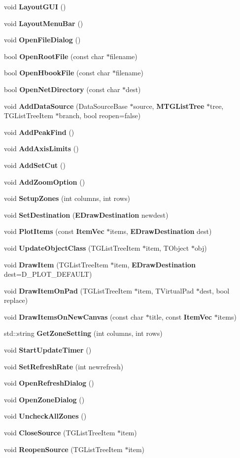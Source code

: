 \begin{DoxyCompactItemize}
\item 
void {\bf LayoutGUI} ()
\item 
void {\bf LayoutMenuBar} ()
\item 
void {\bf OpenFileDialog} ()
\item 
bool {\bf OpenRootFile} (const char $\ast$filename)
\item 
bool {\bf OpenHbookFile} (const char $\ast$filename)
\item 
bool {\bf OpenNetDirectory} (const char $\ast$dest)
\item 
void {\bf AddDataSource} (DataSourceBase $\ast$source, {\bf MTGListTree} $\ast$tree, TGListTreeItem $\ast$branch, bool reopen=false)
\item 
void {\bf AddPeakFind} ()
\item 
void {\bf AddAxisLimits} ()
\item 
void {\bf AddSetCut} ()
\item 
void {\bf AddZoomOption} ()
\item 
void {\bf SetupZones} (int columns, int rows)
\item 
void {\bf SetDestination} ({\bf EDrawDestination} newdest)
\item 
void {\bf PlotItems} (const {\bf ItemVec} $\ast$items, {\bf EDrawDestination} dest)
\item 
void {\bf UpdateObjectClass} (TGListTreeItem $\ast$item, TObject $\ast$obj)
\item 
void {\bf DrawItem} (TGListTreeItem $\ast$item, {\bf EDrawDestination} dest=D\_\-PLOT\_\-DEFAULT)
\item 
void {\bf DrawItemOnPad} (TGListTreeItem $\ast$item, TVirtualPad $\ast$dest, bool replace)
\item 
void {\bf DrawItemsOnNewCanvas} (const char $\ast$title, const {\bf ItemVec} $\ast$items)
\item 
std::string {\bf GetZoneSetting} (int columns, int rows)
\item 
void {\bf StartUpdateTimer} ()
\item 
void {\bf SetRefreshRate} (int newrefresh)
\item 
void {\bf OpenRefreshDialog} ()
\item 
void {\bf OpenZoneDialog} ()
\item 
void {\bf UncheckAllZones} ()
\item 
void {\bf CloseSource} (TGListTreeItem $\ast$item)
\item 
void {\bf ReopenSource} (TGListTreeItem $\ast$item)

\end{DoxyCompactItemize}
